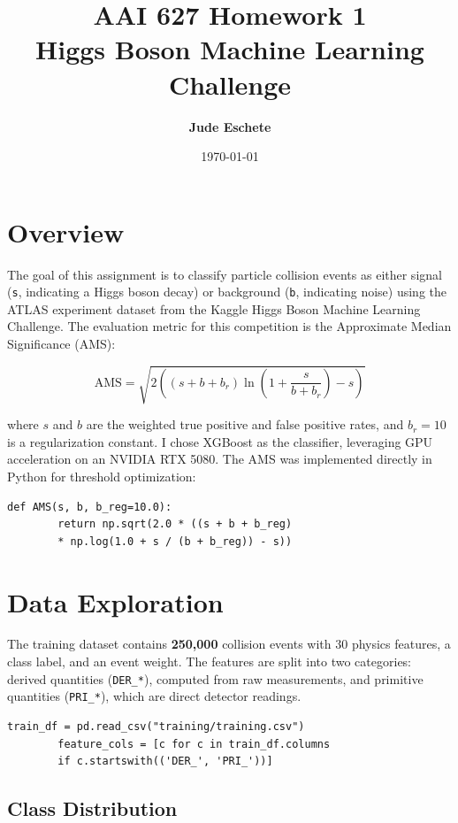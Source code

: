 \documentclass[12pt]{article}
\title{\textbf{AAI 627 Homework 1\\Higgs Boson Machine Learning Challenge}}
\author{\textbf{Jude Eschete}}
\date{\today}
\begin{document}
	
	\maketitle
	\newpage
	
	\section*{Overview}
	
	The goal of this assignment is to classify particle collision events as either signal (\texttt{s}, indicating a Higgs boson decay) or background (\texttt{b}, indicating noise) using the ATLAS experiment dataset from the Kaggle Higgs Boson Machine Learning Challenge. The evaluation metric for this competition is the Approximate Median Significance (AMS):
	
	\[
	\text{AMS} = \sqrt{2\left((s + b + b_r)\ln\left(1 + \frac{s}{b + b_r}\right) - s\right)}
	\]
	
	where $s$ and $b$ are the weighted true positive and false positive rates, and $b_r = 10$ is a regularization constant. I chose XGBoost as the classifier, leveraging GPU acceleration on an NVIDIA RTX 5080. The AMS was implemented directly in Python for threshold optimization:
	
	\begin{lstlisting}[caption={AMS metric implementation}]
		def AMS(s, b, b_reg=10.0):
		return np.sqrt(2.0 * ((s + b + b_reg) 
		* np.log(1.0 + s / (b + b_reg)) - s))
	\end{lstlisting}
	
	\newpage
	\section*{Data Exploration}
	
	The training dataset contains \textbf{250,000} collision events with 30 physics features, a class label, and an event weight. The features are split into two categories: derived quantities (\texttt{DER\_*}), computed from raw measurements, and primitive quantities (\texttt{PRI\_*}), which are direct detector readings.
	
	\begin{lstlisting}[caption={Loading and identifying features}]
		train_df = pd.read_csv("training/training.csv")
		feature_cols = [c for c in train_df.columns 
		if c.startswith(('DER_', 'PRI_'))]
	\end{lstlisting}
	
	\subsection*{Class Distribution}
	
\end{document}

